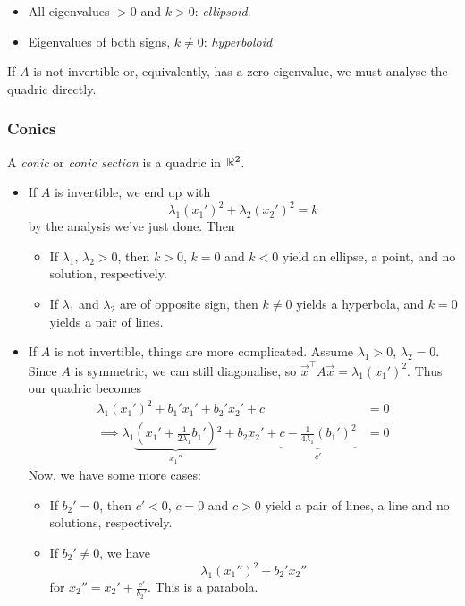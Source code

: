 \documentclass{../template/note}
\begin{document}
    \begin{itemize}
        \item All eigenvalues \(>0\) and \(k>0\): \emph{ellipsoid}.
        \item Eigenvalues of both signs, \(k \neq 0\): \emph{hyperboloid}
    \end{itemize}
    
    If \(A\) is not invertible or, equivalently, has a zero eigenvalue, we must analyse the quadric directly.

    \subsubsection{Conics}

    \begin{definition}
        A \emph{conic} or \emph{conic section} is a quadric in \(\mathbb R^2\).
    \end{definition}
    
    \begin{itemize}
        \item If \(A\) is invertible, we end up with
        \[
            \lambda_1 (x_1')^2 + \lambda_2 (x_2')^2 = k
        \]
        by the analysis we've just done. Then
        \begin{itemize}
            \item If \(\lambda_1\), \(\lambda_2 > 0\), then \(k > 0\), \(k = 0\) and \(k < 0\) yield an ellipse, a point, and no solution, respectively.
            \item If \(\lambda_1\) and \(\lambda_2\) are of opposite sign, then \(k \neq 0\) yields a hyperbola, and \(k = 0\) yields a pair of lines.
        \end{itemize}
        \item If \(A\) is not invertible, things are more complicated. Assume \(\lambda_1 > 0\), \(\lambda_2 = 0\). Since \(A\) is symmetric, we can still diagonalise, so \(\vec x^\intercal A \vec x = \lambda_1(x_1')^2\). Thus our quadric becomes
        \begin{align*}
            \lambda_1(x_1')^2 + b_1'x_1' + b_2'x_2' + c &= 0 \\
            \implies \lambda_1 \underbrace{\left(x_1' + \frac{1}{2 \lambda_1}b_1'\right)}_{x_1''} {^2} + b_2x_2' + \underbrace{c - \frac{1}{4\lambda_1}(b_1')^2}_{c'} &= 0
        \end{align*}    
        Now, we have some more cases:
        \begin{itemize}
            \item If \(b_2'=0\), then \(c' < 0\), \(c = 0\) and \(c > 0\) yield a pair of lines, a line and no solutions, respectively.
            \item If \(b_2'\neq 0\), we have
            \[
                \lambda_1(x_1'')^2 + b_2'x_2''
            \]
            for \(x_2'' = x_2' + \frac{c'}{b_2'}\). This is a parabola.
        \end{itemize}
    \end{itemize}
    
\end{document}
